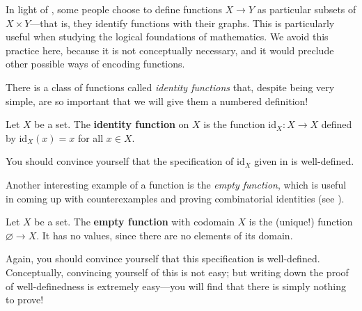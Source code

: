 \begin{aside}
In light of , some people choose to define functions $X \to Y$ as particular subsets of $X \times Y$---that is, they identify functions with their graphs. This is particularly useful when studying the logical foundations of mathematics. We avoid this practice here, because it is not conceptually necessary, and it would preclude other possible ways of encoding functions.
\end{aside}

There is a class of functions called \textit{identity functions} that, despite being very simple, are so important that we will give them a numbered definition!

\begin{definition}
\label{defIdentityFunction}
Let $X$ be a set. The \textbf{identity function} on $X$ is the function $\mathrm{id}_X : X \to X$  defined by $\mathrm{id}_X(x)=x$ for all $x \in X$.
\end{definition}

You should convince yourself that the specification of $\mathrm{id}_X$ given in  is well-defined.

Another interesting example of a function is the \textit{empty function}, which is useful in coming up with counterexamples and proving combinatorial identities (see ).

\begin{definition}
\label{defEmptyFunction}
Let $X$ be a set. The \textbf{empty function} with codomain $X$ is the (unique!) function $\varnothing \to X$. It has no values, since there are no elements of its domain.
\end{definition}

Again, you should convince yourself that this specification is well-defined. Conceptually, convincing yourself of this is not easy; but writing down the proof of well-definedness is extremely easy---you will find that there is simply nothing to prove!


